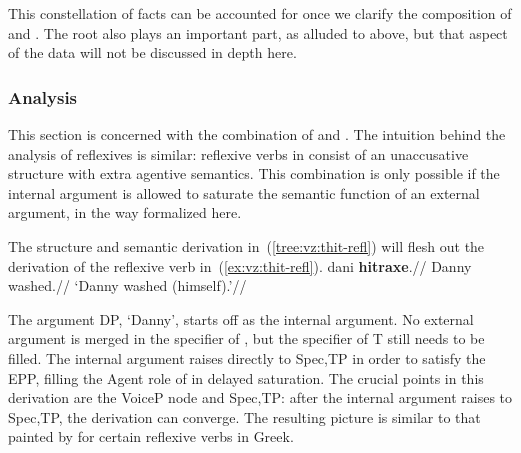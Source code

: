 {This constellation of facts can be accounted for once we clarify the composition of {\va} and {\vz}. The root also plays an important part, as alluded to above, but that aspect of the data will not be discussed in depth here.

		\subsubsection{Analysis} \label{vz:va:refl:analysis}
This section is concerned with the combination of {\va} and {\vz}. The intuition behind the analysis of reflexives is similar: reflexive verbs in {\thit} consist of an unaccusative structure with extra agentive semantics. This combination is only possible if the internal argument is allowed to saturate the semantic function of an external argument, in the way formalized here.

The structure and semantic derivation in~(\ref{tree:vz:thit-refl}) will flesh out the derivation of the reflexive verb in~(\ref{ex:vz:thit-refl}).
\ex \label{ex:vz:thit-refl}
\begingl
\gla dani \textbf{hitraxe\texttslig}.//
\glb Danny washed.//
\glft `Danny washed (himself).'//
\endgl
\xe

The argument DP, `Danny', starts off as the internal argument. No external argument is merged in the specifier of {\vz}, but the specifier of T still needs to be filled. The internal argument raises directly to Spec,TP in order to satisfy the EPP, filling the Agent role of {\vz} in delayed saturation. The crucial points in this derivation are the VoiceP node and Spec,TP: after the internal argument raises to Spec,TP, the derivation can converge. The resulting picture is similar to that painted by \cite{spathasetal15} for certain reflexive verbs in Greek.

\ex \label{tree:vz:thit-refl}
\hspace{-7em}
}
